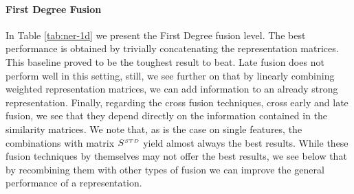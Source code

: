\paragraph{First Degree Fusion }
In Table \ref{tab:ner-1d} we present the First Degree fusion level. The best performance is obtained by trivially concatenating the representation matrices. This baseline proved to be the toughest result to beat. Late fusion does not perform well in this setting, still, we see further on that by linearly combining weighted representation matrices, we can add information to an already strong representation. Finally, regarding the cross fusion techniques, cross early and late fusion, we see that they depend directly on the information contained in the similarity matrices. We note that, as is the case on single features, the combinations with matrix $S^{\scriptscriptstyle STD}$ yield almost always the best results. While these fusion techniques by themselves may not offer the best results, we see below that by recombining them with other types of fusion we can improve the general performance of a representation.





